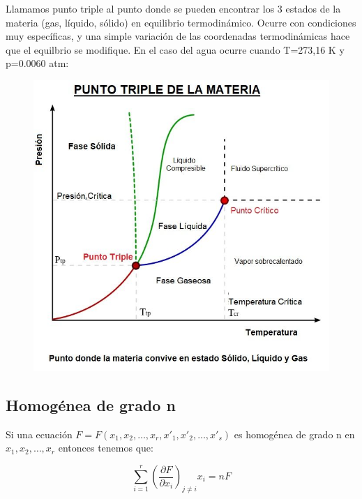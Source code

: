 \documentclass[12pt,a4paper]{article}
\newcommand{\parentesis}[1]{\left( #1 \right)}
\newcommand{\parciales}[2]{\frac{\partial #1}{\partial #2}}
\begin{document}
Llamamos punto triple al punto donde se pueden encontrar los 3 estados de la materia (gas, líquido, sólido) en equilibrio termodinámico. Ocurre con condiciones muy específicas, y una simple variación de las coordenadas termodinámicas hace que el equilbrio se modifique. En el caso del agua ocurre cuando T=273,16 K y p=0.0060 atm: \\

\begin{figure}[h!] \centering
\includegraphics[scale=0.4]{Punto-triple-agua.png}
\end{figure}


\subsection{Homogénea de grado n \label{sub:anex-homogenea}}
Si una ecuación $F=F(x_1,x_2,\ldots, x_r, x'_1, x'_2, \ldots, x'_s)$ es homogénea de grado n en $x_1, x_2, \ldots, x_r$ entonces tenemos que:

\begin{equation}
\sum_{i=1}^r  \parentesis{\parciales{F}{x_i}}_{j \neq i} x_i = n F
\end{equation}
\end{document}
